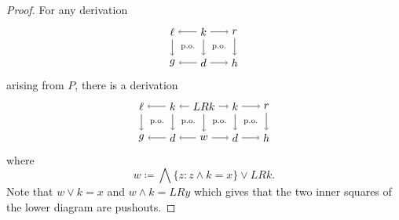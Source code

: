 \documentclass{amsart}
\theoremstyle{remark}
\theoremstyle{definition}
\begin{document}
\begin{proof}
  For any derivation
  \[
  \begin{tikzpicture}
    \node (1t) at (0,1) {$ \ell $};
    \node (2t) at (1,1) {$ k $};
    \node (3t) at (2,1) {$ r $};
    \node (1b) at (0,0) {$ g $};
    \node (2b) at (1,0) {$ d $};
    \node (3b) at (2,0) {$ h $};
    \draw [->] (2t) to node [] {\scriptsize{$  $}} (1t);
    \draw [->] (2t) to node [] {\scriptsize{$  $}} (3t);
    \draw [->] (2b) to node [] {\scriptsize{$  $}} (1b);
    \draw [->] (2b) to node [] {\scriptsize{$  $}} (3b);
    \draw [->] (1t) to node [] {\scriptsize{$  $}} (1b);
    \draw [->] (2t) to node [] {\scriptsize{$  $}} (2b);
    \draw [->] (3t) to node [] {\scriptsize{$  $}} (3b);
    \node () at (0.5,0.5) {\scriptsize{p.o.}};
    \node () at (1.5,0.5) {\scriptsize{p.o.}};
  \end{tikzpicture}
  \]
  arising from $ P $, there is a derivation
  \[
  \begin{tikzpicture}
    \node (01) at (0,1) {$ \ell $};
    \node (11) at (1,1) {$ k $};
    \node (21) at (2,1) {$ LRk $};
    \node (31) at (3,1) {$ k $};
    \node (41) at (4,1) {$ r $};
    \node (00) at (0,0) {$ g $};
    \node (10) at (1,0) {$ d $};
    \node (20) at (2,0) {$ w $};
    \node (30) at (3,0) {$ d $};
    \node (40) at (4,0) {$ h $};
    \draw [->] (11) to node [] {\scriptsize{$  $}} (01);
    \draw [->] (21) to node [] {\scriptsize{$  $}} (11);
    \draw [->] (21) to node [] {\scriptsize{$  $}} (31);
    \draw [->] (31) to node [] {\scriptsize{$  $}} (41);
    \draw [->] (10) to node [] {\scriptsize{$  $}} (00);
    \draw [->] (20) to node [] {\scriptsize{$  $}} (10);
    \draw [->] (20) to node [] {\scriptsize{$  $}} (30);
    \draw [->] (30) to node [] {\scriptsize{$  $}} (40);
    \draw [->] (01) to node [] {\scriptsize{$  $}} (00);
    \draw [->] (11) to node [] {\scriptsize{$  $}} (10);
    \draw [->] (21) to node [] {\scriptsize{$  $}} (20);
    \draw [->] (31) to node [] {\scriptsize{$  $}} (30);
    \draw [->] (41) to node [] {\scriptsize{$  $}} (40);
    \node () at (0.5,0.5) {\scriptsize{p.o.}};
    \node () at (1.5,0.5) {\scriptsize{p.o.}};
    \node () at (2.5,0.5) {\scriptsize{p.o.}};
    \node () at (3.5,0.5) {\scriptsize{p.o.}};
  \end{tikzpicture}
  \]
  where 
  \[
    w \coloneqq
    \bigwedge \{ z \colon z \wedge k = x \} \vee LRk.
  \]
  Note that $ w \vee k = x $ and $ w \wedge k = LRy $ which gives that
  the two inner squares of the lower diagram are pushouts.
\end{proof}
\end{document}
